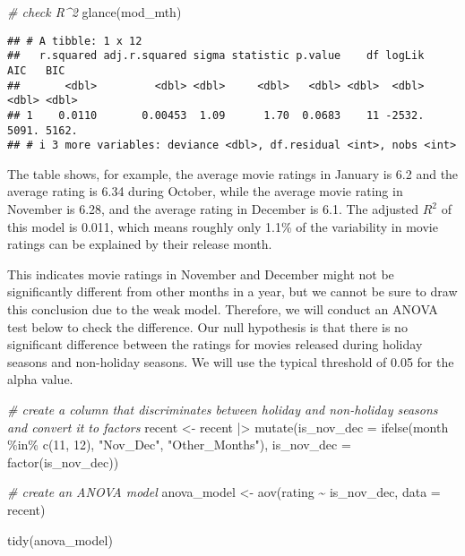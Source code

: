 \documentclass[
]{article}
\newenvironment{Shaded}{\begin{snugshade}}{\end{snugshade}}
\newcommand{\AttributeTok}[1]{\textcolor[rgb]{0.77,0.63,0.00}{#1}}
\newcommand{\CommentTok}[1]{\textcolor[rgb]{0.56,0.35,0.01}{\textit{#1}}}
\newcommand{\DecValTok}[1]{\textcolor[rgb]{0.00,0.00,0.81}{#1}}
\newcommand{\FunctionTok}[1]{\textcolor[rgb]{0.00,0.00,0.00}{#1}}
\newcommand{\NormalTok}[1]{#1}
\newcommand{\OtherTok}[1]{\textcolor[rgb]{0.56,0.35,0.01}{#1}}
\newcommand{\SpecialCharTok}[1]{\textcolor[rgb]{0.00,0.00,0.00}{#1}}
\newcommand{\StringTok}[1]{\textcolor[rgb]{0.31,0.60,0.02}{#1}}
\begin{document}
\begin{Shaded}
\begin{Highlighting}[]
\CommentTok{\# check R\^{}2}
\FunctionTok{glance}\NormalTok{(mod\_mth)}
\end{Highlighting}
\end{Shaded}

\begin{verbatim}
## # A tibble: 1 x 12
##   r.squared adj.r.squared sigma statistic p.value    df logLik   AIC   BIC
##       <dbl>         <dbl> <dbl>     <dbl>   <dbl> <dbl>  <dbl> <dbl> <dbl>
## 1    0.0110       0.00453  1.09      1.70  0.0683    11 -2532. 5091. 5162.
## # i 3 more variables: deviance <dbl>, df.residual <int>, nobs <int>
\end{verbatim}

The table shows, for example, the average movie ratings in January is
6.2 and the average rating is 6.34 during October, while the average
movie rating in November is 6.28, and the average rating in December is
6.1. The adjusted \(R^2\) of this model is 0.011, which means roughly
only 1.1\% of the variability in movie ratings can be explained by their
release month.

This indicates movie ratings in November and December might not be
significantly different from other months in a year, but we cannot be
sure to draw this conclusion due to the weak model. Therefore, we will
conduct an ANOVA test below to check the difference. Our null hypothesis
is that there is no significant difference between the ratings for
movies released during holiday seasons and non-holiday seasons. We will
use the typical threshold of 0.05 for the alpha value.

\begin{Shaded}
\begin{Highlighting}[]
\CommentTok{\# create a column that discriminates between holiday and non{-}holiday seasons and convert it to factors}
\NormalTok{recent }\OtherTok{\textless{}{-}}\NormalTok{ recent }\SpecialCharTok{|\textgreater{}}
  \FunctionTok{mutate}\NormalTok{(}\AttributeTok{is\_nov\_dec =} \FunctionTok{ifelse}\NormalTok{(month }\SpecialCharTok{\%in\%} \FunctionTok{c}\NormalTok{(}\DecValTok{11}\NormalTok{, }\DecValTok{12}\NormalTok{), }\StringTok{"Nov\_Dec"}\NormalTok{, }\StringTok{"Other\_Months"}\NormalTok{),}
         \AttributeTok{is\_nov\_dec =} \FunctionTok{factor}\NormalTok{(is\_nov\_dec))}

\CommentTok{\# create an ANOVA model}
\NormalTok{anova\_model }\OtherTok{\textless{}{-}} \FunctionTok{aov}\NormalTok{(rating }\SpecialCharTok{\textasciitilde{}}\NormalTok{ is\_nov\_dec, }\AttributeTok{data =}\NormalTok{ recent)}

\FunctionTok{tidy}\NormalTok{(anova\_model)}
\end{Highlighting}
\end{Shaded}
\end{document}

